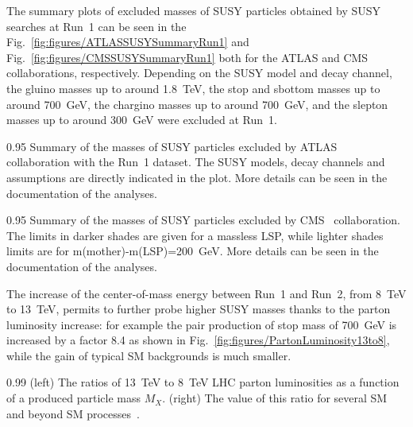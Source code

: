 The summary plots of excluded masses of SUSY particles obtained by SUSY searches at Run~1 can be seen in the Fig.~\ref{fig:figures/ATLASSUSYSummaryRun1} and Fig.~\ref{fig:figures/CMSSUSYSummaryRun1} both for the ATLAS and CMS collaborations, respectively. Depending on the SUSY model and decay channel, the gluino masses up to around 1.8~TeV, the stop and sbottom masses up to around 700~GeV, the chargino masses up to around 700~GeV, and the slepton masses up to around 300~GeV were excluded at Run~1. 


                 {0.95}       %
                 {Summary of the masses of SUSY particles excluded by ATLAS~\cite{website:SUSYresRunIATLAS} collaboration with the Run~1 dataset. The SUSY models, decay channels and assumptions are directly indicated in the plot. More details can be seen in the documentation of the analyses. }


                 {0.95}       %
                 {Summary of the masses of SUSY particles excluded by CMS~\cite{website:SUSYresRunI} collaboration. The limits in darker shades are given for a massless LSP, while lighter shades limits are for m(mother)-m(LSP)=200~GeV. More details can be seen in the documentation of the analyses. }

The increase of the center-of-mass energy between Run~1 and Run~2, from 8~TeV to 13~TeV, permits to further probe higher SUSY masses thanks to  the parton luminosity increase: for example the pair production of stop mass of 700~GeV is increased by a factor 8.4 as shown in Fig.~\ref{fig:figures/PartonLuminosity13to8}, while the gain of typical SM backgrounds is much smaller.

                 {0.99}       %
                 {(left) The ratios of 13~TeV to 8~TeV LHC parton luminosities as a function of a produced particle mass $M_{X}$. (right) The value of this ratio for several SM and beyond SM processes~\cite{Hoecker:2236645}.}


